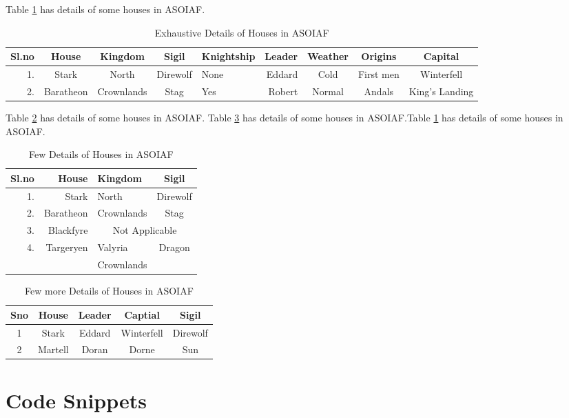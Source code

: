 \documentclass[10pt,a4paper]{article}
\begin{document}
Table \ref{Tab1} has details of some houses in ASOIAF.

\begin{table}[h]
\centering
\caption{Exhaustive Details of Houses in ASOIAF}
\label{Tab1}
\begin{tabular}{|r|c|c|c|l|r|c|c|c|}
\hline
Sl.no & House & Kingdom & Sigil & Knightship & Leader & Weather & Origins & Capital \\\hline
1. & Stark & North & Direwolf & None & Eddard & Cold & First men & Winterfell\\\hline \hline
2. & Baratheon & Crownlands & Stag & Yes & Robert & Normal & Andals & King's Landing\\\hline
\end{tabular}
\end{table}

Table \ref{Tab2} has details of some houses in ASOIAF. Table \ref{Tab3} has details of some houses in ASOIAF.Table \ref{Tab1} has details of some houses in ASOIAF.

\begin{table}[h]
\centering
\caption{Few Details of Houses in ASOIAF}
\label{Tab2}
\begin{tabular}{|r|r|l|c|}
\hline
Sl.no & House & Kingdom & Sigil \\\hline
1. & Stark & North & Direwolf \\\hline
2. & Baratheon & Crownlands & Stag \\\hline
3. & Blackfyre & \multicolumn{2}{c|}{Not Applicable}\\\hline
4. & Targeryen & Valyria & Dragon\\
\cline{2-3}
 &  & Crownlands & \\ \hline 

\end{tabular}
\end{table}

\begin{table}
\centering
\caption{Few more Details of Houses in ASOIAF}
\label{Tab3}
\begin{tabular}{|c|c|c|c|c|}
\hline 
Sno & House & Leader & Captial & Sigil \\ 
\hline 
1 & Stark & Eddard & Winterfell & Direwolf \\ 
\hline 
2 & Martell & Doran & Dorne & Sun \\ 
\hline 
\end{tabular} 
\end{table}

\section{Code Snippets}
\end{document}
